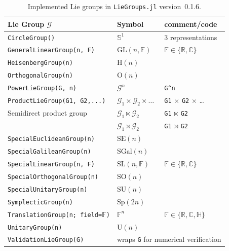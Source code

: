 \documentclass{juliacon}
\newcommand{\LieGroupsVersion}{0.1.6}
\begin{document}
\begin{table}[tbp]
    \centering
    \caption{Implemented Lie groups in \texttt{LieGroups.jl} version~\LieGroupsVersion{}.}
    \begin{tabular}{@{}lll@{}}
        \toprule
        \textbf{Lie Group $\mathcal G$} & \textbf{Symbol} & comment/code\\
        \midrule
        \verb|CircleGroup()| & \(\mathbb{S}^1\) & 3 representations \\
        \verb|GeneralLinearGroup(n, F)| & \(\mathrm{GL}(n, \mathbb{F})\) & $\mathbb{F} \in \{\mathbb{R}, \mathbb{C}\}$\\
        \verb|HeisenbergGroup(n)| & \(\mathrm{H}(n)\)\\
        \verb|OrthogonalGroup(n)| & \(\mathrm{O}(n)\) &\\
        \midrule
        \verb|PowerLieGroup(G, n)| & \(\mathcal G^n\) & \verb|G^n|\\
        \verb|ProductLieGroup(G1, G2,...)| & \(\mathcal G_1 \times \mathcal G_2 \times \ldots\) & \verb|G1| $\times$ \verb|G2| $\times$ \ldots\\
        Semidirect product group & \(\mathcal G_1 \ltimes \mathcal G_2\) & \verb|G1| $\ltimes$ \verb|G2|\\
                                 & \(\mathcal G_1 \rtimes \mathcal G_2\) & \verb|G1| $\rtimes$ \verb|G2|\\
        \midrule
        \verb|SpecialEuclideanGroup(n)| & \(\mathrm{SE}(n)\) & \\
        \verb|SpecialGalileanGroup(n)| & \(\mathrm{SGal}(n)\) &  \\
        \verb|SpecialLinearGroup(n, F)| & \(\mathrm{SL}(n, \mathbb{F})\) & $\mathbb{F} \in \{\mathbb{R}, \mathbb{C}\}$\\
        \verb|SpecialOrthogonalGroup(n)| & \(\mathrm{SO}(n)\) &  \\
        \verb|SpecialUnitaryGroup(n)| & \(\mathrm{SU}(n)\) & \\
        \midrule
        \verb|SymplecticGroup(n)| & \(\mathrm{Sp}(2n)\) & \\
        \verb|TranslationGroup(n; field=|$\mathbb{F}$\verb|)| & \(\mathbb{F}^n\) & $\mathbb{F} \in \{\mathbb{R}, \mathbb{C}, \mathbb{H}\}$\\
        \verb|UnitaryGroup(n)| & \(\mathrm{U}(n)\) & \\
        \verb|ValidationLieGroup(G)| & \multicolumn{2}{l}{wraps \texttt{G} for numerical verification}\\
        \bottomrule
    \end{tabular}
    \label{tab:available_lie_groups}
\end{table}
\end{document}
